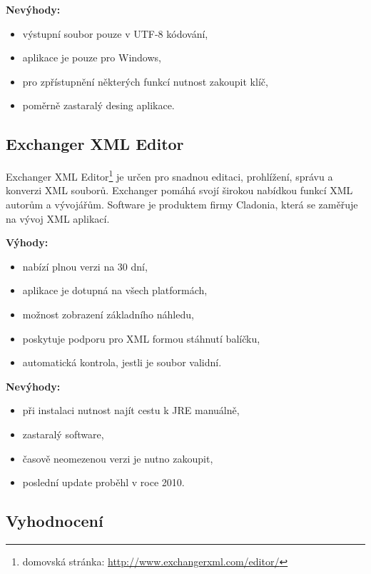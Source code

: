             \textbf{Nevýhody:}
                \begin{itemize}
                    \item výstupní soubor pouze v UTF-8 kódování,
                    \item aplikace je pouze pro Windows,
                    \item pro zpřístupnění některých funkcí nutnost zakoupit klíč,
                    \item poměrně zastaralý desing aplikace.
                \end{itemize}

        \subsection{Exchanger XML Editor}
            Exchanger XML Editor\footnote{domovská stránka: \url{http://www.exchangerxml.com/editor/}} je určen pro snadnou editaci, prohlížení, správu a konverzi XML souborů. Exchanger pomáhá svojí širokou nabídkou funkcí XML autorům a vývojářům.  Software je produktem firmy Cladonia, která se zaměřuje na vývoj XML aplikací. 
            
            \textbf{Výhody:}
                \begin{itemize}
                    \item nabízí plnou verzi na 30 dní,
                    \item aplikace je dotupná na všech platformách,
                    \item možnost zobrazení základního náhledu,
                    \item poskytuje podporu pro XML formou stáhnutí balíčku,
                    \item automatická kontrola, jestli je soubor validní.
                \end{itemize}
                
            \textbf{Nevýhody:}
                \begin{itemize}
                    \item při instalaci nutnost najít cestu k JRE manuálně,
                    \item zastaralý software,
                    \item časově neomezenou verzi je nutno zakoupit,
                    \item poslední update proběhl v roce 2010.
                \end{itemize}
        \subsection{Vyhodnocení}

